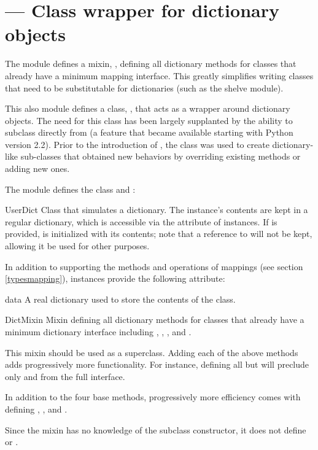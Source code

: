 \section{ ---
         Class wrapper for dictionary objects}



The module defines a mixin,  , defining all dictionary
methods for classes that already have a minimum mapping interface.  This
greatly simplifies writing classes that need to be substitutable for
dictionaries (such as the shelve module).

This also module defines a class, , that acts as a wrapper
around dictionary objects.  The need for this class has been largely
supplanted by the ability to subclass directly from  (a feature
that became available starting with Python version 2.2).  Prior to the
introduction of , the  class was used to
create dictionary-like sub-classes that obtained new behaviors by overriding
existing methods or adding new ones.

The  module defines the  class
and :

\begin{classdesc}{UserDict}{}
Class that simulates a dictionary.  The instance's
contents are kept in a regular dictionary, which is accessible via the
 attribute of  instances.  If
 is provided,  is initialized with its
contents; note that a reference to  will not be kept, 
allowing it be used for other purposes.
\end{classdesc}

In addition to supporting the methods and operations of mappings (see
section \ref{typesmapping}),  instances provide the
following attribute:

\begin{memberdesc}{data}
A real dictionary used to store the contents of the 
class.
\end{memberdesc}

\begin{classdesc}{DictMixin}{}
Mixin defining all dictionary methods for classes that already have
a minimum dictionary interface including ,
, , and .

This mixin should be used as a superclass.  Adding each of the
above methods adds progressively more functionality.  For instance,
defining all but  will preclude only 
and  from the full interface.

In addition to the four base methods, progressively more efficiency
comes with defining , , and
.

Since the mixin has no knowledge of the subclass constructor, it
does not define  or .
\end{classdesc}


